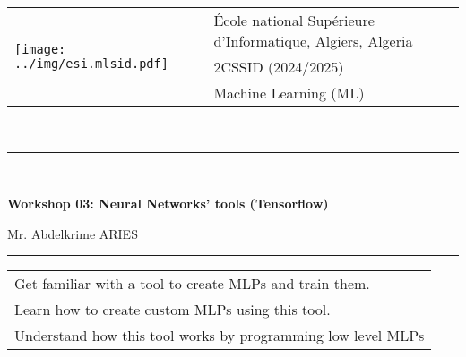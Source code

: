 \documentclass[11pt, a4paper]{article}
\begin{document}
	
	\begin{tabular}{ll}
		\multirow{3}{*}{\texttt{[image: ../img/esi.mlsid.pdf]}} 
		& \'Ecole national Supérieure d'Informatique, Algiers, Algeria\\
		& 2CSSID (2024/2025)\\
		& Machine Learning (ML)
	\end{tabular}\\[.25cm]
	\noindent\rule{\textwidth}{1pt}\\[-0.5cm]
	\begin{center}
		{\LARGE \textbf{Workshop 03: Neural Networks' tools (Tensorflow)}}
		\begin{flushright}
			Mr. Abdelkrime ARIES
		\end{flushright}
	\end{center}\vspace{-.25cm}
	\noindent\rule{\textwidth}{1pt}
	
	\begin{center}
		\begin{tabular}{|p{}|}
			\hline
			Get familiar with a tool to create MLPs and train them.  \\
			Learn how to create custom MLPs using this tool. \\
			Understand how this tool works by programming low level MLPs \\
			\hline
		\end{tabular}
	\end{center}

%
\end{document}
